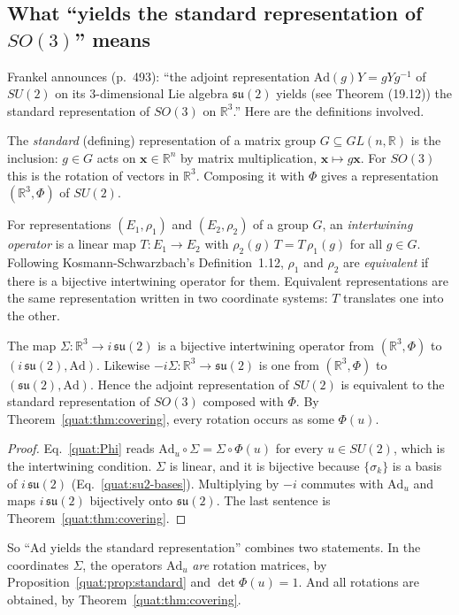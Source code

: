 \subsection{What ``yields the standard representation of \texorpdfstring{$SO(3)$}{SO(3)}'' means}\label{quat:sec:standard-rep}
Frankel announces (p.~493): ``the adjoint representation
$\mathrm{Ad}(g)Y=gYg^{-1}$ of $SU(2)$ on its $3$-dimensional Lie algebra
$\mathfrak{su}(2)$ yields (see Theorem (19.12)) the standard representation
of $SO(3)$ on $\mathbb R^3$.'' Here are the definitions involved.

The \emph{standard} (defining) representation of a matrix group
$G\subseteq GL(n,\mathbb R)$ is the inclusion: $g\in G$ acts on
$\mathbf x\in\mathbb R^n$ by matrix multiplication, $\mathbf x\mapsto g\mathbf x$.
For $SO(3)$ this is the rotation of vectors in $\mathbb R^3$. Composing it
with $\Phi$ gives a representation $(\mathbb R^3,\Phi)$ of $SU(2)$.

For representations $(E_1,\rho_1)$ and $(E_2,\rho_2)$ of a group $G$, an
\emph{intertwining operator} is a linear map $T\colon E_1\to E_2$ with
$\rho_2(g)\,T=T\,\rho_1(g)$ for all $g\in G$. Following Kosmann-Schwarzbach's
Definition~1.12, $\rho_1$ and $\rho_2$ are \emph{equivalent} if there is a
bijective intertwining operator for them. Equivalent representations are the
same representation written in two coordinate systems: $T$ translates one
into the other.

\begin{proposition}\label{quat:prop:standard}
The map $\Sigma\colon\mathbb R^3\to i\,\mathfrak{su}(2)$ is a bijective
intertwining operator from $(\mathbb R^3,\Phi)$ to
$(i\,\mathfrak{su}(2),\mathrm{Ad})$. Likewise
$-i\Sigma\colon\mathbb R^3\to\mathfrak{su}(2)$ is one from $(\mathbb R^3,\Phi)$
to $(\mathfrak{su}(2),\mathrm{Ad})$. Hence the adjoint representation of
$SU(2)$ is equivalent to the standard representation of $SO(3)$ composed with
$\Phi$. By Theorem~\ref{quat:thm:covering}, every rotation occurs as some
$\Phi(u)$.
\end{proposition}
\begin{proof}
Eq.~\eqref{quat:Phi} reads $\mathrm{Ad}_u\circ\Sigma=\Sigma\circ\Phi(u)$
for every $u\in SU(2)$, which is the intertwining condition. $\Sigma$ is
linear, and it is bijective because $\{\sigma_k\}$ is a basis of
$i\,\mathfrak{su}(2)$ (Eq.~\eqref{quat:su2-bases}). Multiplying by $-i$
commutes with $\mathrm{Ad}_u$ and maps $i\,\mathfrak{su}(2)$ bijectively
onto $\mathfrak{su}(2)$. The last sentence is Theorem~\ref{quat:thm:covering}.
\end{proof}
So ``$\mathrm{Ad}$ yields the standard representation'' combines two
statements. In the coordinates $\Sigma$, the operators $\mathrm{Ad}_u$
\emph{are} rotation matrices, by Proposition~\ref{quat:prop:standard} and
$\det\Phi(u)=1$. And all rotations are obtained, by
Theorem~\ref{quat:thm:covering}.

